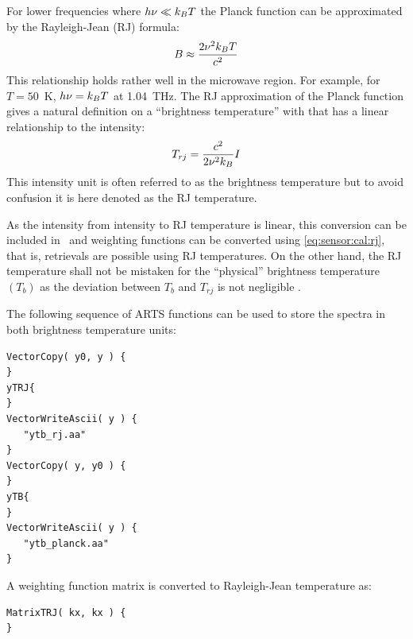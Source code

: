  For lower frequencies where $h\nu \ll k_BT$ the Planck function can
 be approximated by the Rayleigh-Jean (RJ) formula:
 \begin{equation}
   B \approx \frac{2\nu^2k_BT}{c^2}
 \end{equation}
 This relationship holds rather well in the microwave region. For example,
 for $T=50$~K, $h\nu = k_BT$ at 1.04~THz. The RJ approximation of the Planck
 function gives a natural definition on a ``brightness temperature'' with
 that has a linear relationship to the intensity:
 \begin{equation}
   T_{rj} = \frac{c^2}{2\nu^2k_B} I
   \label{eq:sensor:cal:rj}
 \end{equation}
 This intensity unit is often referred to as the brightness temperature but
 to avoid confusion it is here denoted as the RJ temperature.
 
 As the intensity from intensity to RJ temperature is linear, this
 conversion can be included in \Hm\ and weighting functions can be
 converted using \ref{eq:sensor:cal:rj}, that is, retrievals are
 possible using RJ temperatures.
 On the other hand, the RJ temperature shall not be mistaken for the
 ``physical'' brightness temperature $(T_b)$ as the deviation between
 $T_b$ and $T_{rj}$ is not negligible \citep{eriksson:97a}.


 \label{sec:sensor:cfe}

 The following sequence of ARTS functions can be used to store the
 spectra in both brightness temperature units:

 {\footnotesize
 \begin{verbatim}
VectorCopy( y0, y ) {
}
yTRJ{
}
VectorWriteAscii( y ) {
   "ytb_rj.aa"
}
VectorCopy( y, y0 ) {
}
yTB{
}
VectorWriteAscii( y ) {
   "ytb_planck.aa"
}
 \end{verbatim}
 }
 \noindent
 A weighting function matrix is converted to Rayleigh-Jean temperature
 as:

 {\footnotesize
 \begin{verbatim}
MatrixTRJ( kx, kx ) {
}

 \end{verbatim}
 }
 



